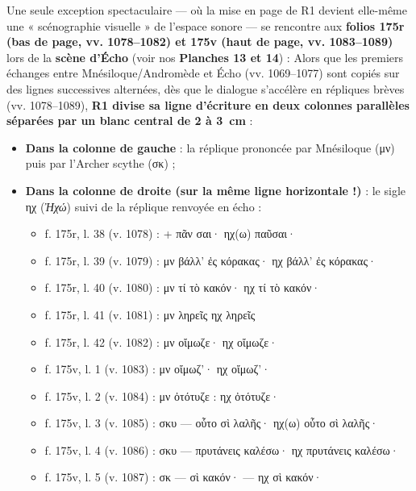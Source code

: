 \documentclass[11pt, a4paper, twoside]{article}
\renewcommand{\_}{\origunderscore\penalty0\relax}
\renewcommand{\texttt}[1]{#1}
\newcommand{\Run}{\textbf{R}\textsuperscript{1}}
\def\Run{R1}%
\begin{document}
Une seule exception spectaculaire — où la mise en page de \Run{} devient elle-même une « scénographie visuelle » de l'espace sonore — se rencontre aux \textbf{folios \texttt{175r} (bas de page, vv. 1078–1082) et \texttt{175v} (haut de page, vv. 1083–1089)} lors de la \textbf{scène d'Écho} (voir nos \textbf{Planches 13 et 14}) :
Alors que les premiers échanges entre Mnésiloque/Andromède et Écho (\texttt{vv. 1069–1077}) sont copiés sur des lignes successives alternées, dès que le dialogue s'accélère en répliques brèves (\texttt{vv. 1078–1089}), \textbf{\Run{} divise sa ligne d'écriture en deux colonnes parallèles séparées par un blanc central de 2 à 3~cm} :
\begin{itemize}[leftmargin=1.5em, itemsep=2pt]
  \item \textbf{Dans la colonne de gauche} : la réplique prononcée par Mnésiloque (\texttt{μν}) puis par l'Archer scythe (\texttt{σκ}) ;
  \item \textbf{Dans la colonne de droite (sur la même ligne horizontale !)} : le sigle \texttt{ηχ} (\textit{Ἠχώ}) suivi de la réplique renvoyée en écho :
  \begin{itemize}[leftmargin=1.5em, itemsep=1pt]
    \item \texttt{f. 175r}, l. 38 (\texttt{v. 1078}) : \texttt{+ πᾶν σαι·} \quad\quad \texttt{ηχ(ω) παῦσαι·}
  \item \texttt{f. 175r}, l. 39 (\texttt{v. 1079}) : \texttt{μν βάλλ' ἐς κόρακας·} \quad \texttt{ηχ βάλλ' ἐς κόρακας·}
  \item \texttt{f. 175r}, l. 40 (\texttt{v. 1080}) : \texttt{μν τί τὸ κακόν·} \quad\quad \texttt{ηχ τί τὸ κακόν·}
  \item \texttt{f. 175r}, l. 41 (\texttt{v. 1081}) : \texttt{μν ληρεῖς} \quad\quad\quad \texttt{ηχ ληρεῖς}
  \item \texttt{f. 175r}, l. 42 (\texttt{v. 1082}) : \texttt{μν οἴμωζε·} \quad\quad\quad \texttt{ηχ οἴμωζε·}
  \item \texttt{f. 175v}, l. 1 (\texttt{v. 1083}) : \texttt{μν οἴμωζ'·} \quad\quad\quad \texttt{ηχ οἴμωζ'·}
  \item \texttt{f. 175v}, l. 2 (\texttt{v. 1084}) : \texttt{μν ὀτότυζε :} \quad\quad \texttt{ηχ ὀτότυζε·}
  \item \texttt{f. 175v}, l. 3 (\texttt{v. 1085}) : \texttt{σκυ — οὗτο σὶ λαλῆς·} \quad \texttt{ηχ(ω) οὗτο σὶ λαλῆς·}
  \item \texttt{f. 175v}, l. 4 (\texttt{v. 1086}) : \texttt{σκυ — πρυτάνεις καλέσω·} \quad \texttt{ηχ πρυτάνεις καλέσω·}
  \item \texttt{f. 175v}, l. 5 (\texttt{v. 1087}) : \texttt{σκ — σὶ κακόν·} \quad\quad \texttt{— ηχ σὶ κακόν·}

\end{itemize}
\end{itemize}
\end{document}
